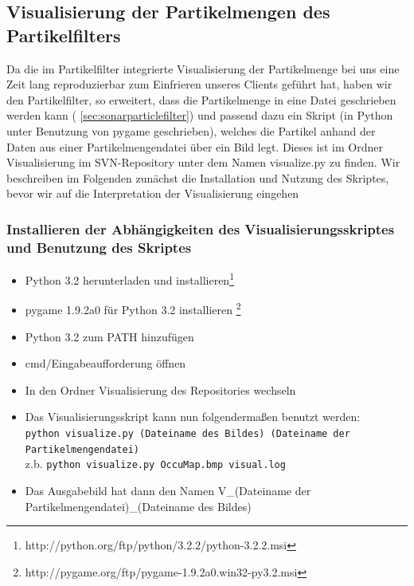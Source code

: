 \subsection{Visualisierung der Partikelmengen des Partikelfilters}
Da die im Partikelfilter integrierte Visualisierung der Partikelmenge bei uns
eine Zeit lang reproduzierbar zum Einfrieren unseres Clients geführt hat,
haben wir den Partikelfilter, so erweitert, dass die
Partikelmenge in eine Datei geschrieben werden kann (
\ref{sec:sonarparticlefilter}) und passend dazu ein Skript (in Python unter
 Benutzung von pygame geschrieben), welches die Partikel anhand der Daten
 aus einer Partikelmengendatei über ein Bild legt. Dieses ist im Ordner
 Visualisierung im SVN-Repository unter dem Namen visualize.py zu finden.
Wir beschreiben im Folgenden zunächst die Installation und Nutzung des
Skriptes, bevor wir auf die Interpretation der Visualisierung eingehen
 \subsubsection{Installieren der Abhängigkeiten des
Visualisierungsskriptes und Benutzung des Skriptes}
 \begin{itemize}
	 \item Python 3.2 herunterladen und installieren\footnote{http://python.org/ftp/python/3.2.2/python-3.2.2.msi}
	 \item pygame 1.9.2a0 für Python 3.2 installieren \footnote{http://pygame.org/ftp/pygame-1.9.2a0.win32-py3.2.msi}
	 \item Python 3.2 zum PATH hinzufügen
	 \item cmd/Eingabeaufforderung öffnen
	 \item In den Ordner Visualisierung des Repositories wechseln
	 \item Das Visualisierungsskript kann nun folgendermaßen benutzt werden:\\
	 		\lstinline|python visualize.py (Dateiname des Bildes) (Dateiname der Partikelmengendatei)| \\
 			z.b. \lstinline|python visualize.py OccuMap.bmp visual.log|
	 \item Das Ausgabebild hat dann den Namen V\_(Dateiname der Partikelmengendatei)\_(Dateiname des Bildes)
\end{itemize}
